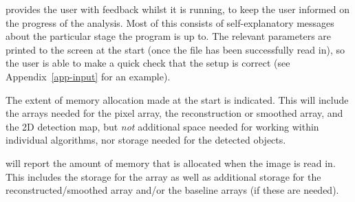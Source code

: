 %
%
%
%
\label{sec-output}


\duchamp provides the user with feedback whilst it is running, to
keep the user informed on the progress of the analysis. Most of this
consists of self-explanatory messages about the particular stage the
program is up to. The relevant parameters are printed to the screen at
the start (once the file has been successfully read in), so the user
is able to make a quick check that the setup is correct (see
Appendix~\ref{app-input} for an example).

The extent of memory allocation made at the start is indicated. This
will include the arrays needed for the pixel array, the reconstruction
or smoothed array, and the 2D detection map, but \emph{not} additional
space needed for working within individual algorithms, nor storage
needed for the detected objects.

\duchamp will report the amount of memory that is allocated when the
image is read in. This includes the storage for the array as well as
additional storage for the reconstructed/smoothed array and/or the
baseline arrays (if these are needed).

